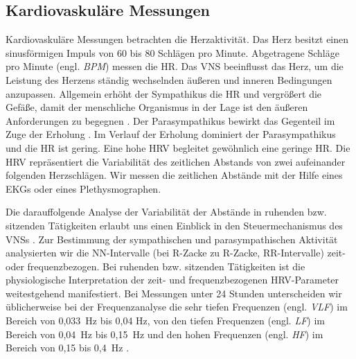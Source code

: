 \subsection{Kardiovaskuläre Messungen}
\label{sub:kardiovaskulaere_messungen}

Kardiovaskuläre Messungen betrachten die Herzaktivität. Das Herz besitzt einen sinusförmigen Impuls von 60 bis 80 Schlägen pro Minute. Abgetragene Schläge pro Minute (engl. \emph{\ac{BPM}}) messen die \ac{HR}. Das \ac{VNS} beeinflusst das Herz, um die Leistung des Herzens ständig wechselnden äußeren und inneren Bedingungen anzupassen. Allgemein erhöht der Sympathikus die \ac{HR} und vergrößert die Gefäße, damit der menschliche Organismus in der Lage ist den äußeren Anforderungen zu begegnen \citep[vgl.][S.~226]{Porges1995}. Der Parasympathikus bewirkt das Gegenteil im Zuge der Erholung \citep[vgl.][S.~226]{Porges1995}. Im Verlauf der Erholung dominiert der Parasympathikus und die \ac{HR} ist gering. Eine hohe \ac{HRV} begleitet gewöhnlich eine geringe \ac{HR}. Die \ac{HRV} repräsentiert die Variabilität des zeitlichen Abstands von zwei aufeinander folgenden Herzschlägen. Wir messen die zeitlichen Abstände mit der Hilfe eines \ac{EKG}s oder eines Plethysmographen.

Die darauffolgende Analyse der Variabilität der Abstände in ruhenden bzw. sitzenden Tätigkeiten erlaubt uns einen Einblick in den Steuermechanismus des \ac{VNS}s \citep[vgl.][]{Jalife1983}. Zur Bestimmung der sympathischen und parasympathischen Aktivität analysierten wir die NN-Intervalle (bei R-Zacke zu R-Zacke, RR-Intervalle) zeit- oder frequenzbezogen. Bei ruhenden bzw. sitzenden Tätigkeiten ist die physiologische Interpretation der zeit- und frequenzbezogenen \ac{HRV}-Parameter weitestgehend manifestiert. Bei Messungen unter 24 Stunden unterscheiden wir üblicherweise bei der Frequenzanalyse die sehr tiefen Frequenzen (engl. \emph{\ac{VLF}}) im Bereich von 0,033~Hz bis 0,04 Hz, von den tiefen Frequenzen (engl. \emph{\ac{LF}}) im Bereich von 0,04~Hz bis 0,15~Hz und den hohen Frequenzen (engl. \emph{\ac{HF}}) im Bereich von 0,15 bis 0,4~Hz \citep[vgl.][S.~360]{TaskForce1996}.


